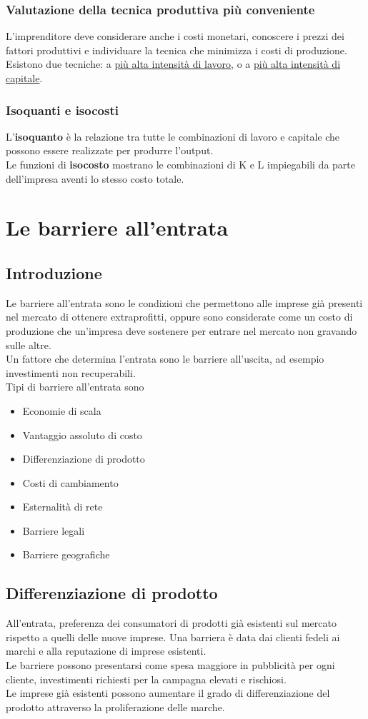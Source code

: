 \documentclass{report}
\begin{document}
	\subsection{Valutazione della tecnica produttiva più conveniente}
	L'imprenditore deve considerare anche i costi monetari, conoscere i prezzi dei fattori produttivi e individuare la tecnica che minimizza i costi di produzione.
	\medskip \\Esistono due tecniche: a \underline{più alta intensità di lavoro}, o a \underline{più alta intensità di capitale}.
	\subsection{Isoquanti e isocosti}
	L'\textbf{isoquanto} è la relazione tra tutte le combinazioni di lavoro e capitale che possono essere realizzate per produrre l'output.
	\medskip \\Le funzioni di \textbf{isocosto} mostrano le combinazioni di K e L impiegabili da parte dell'impresa aventi lo stesso costo totale.
	
	\chapter{Le barriere all'entrata}
	\section{Introduzione}
	Le barriere all'entrata sono le condizioni che permettono alle imprese già presenti nel mercato di ottenere extraprofitti, oppure sono considerate come un costo di produzione che un'impresa deve sostenere per entrare nel mercato non gravando sulle altre.
	\medskip \\Un fattore che determina l'entrata sono le barriere all'uscita, ad esempio investimenti non recuperabili.
	\medskip \\Tipi di barriere all'entrata sono
	\begin{itemize}
		\item Economie di scala
		\item Vantaggio assoluto di costo
		\item Differenziazione di prodotto
		\item Costi di cambiamento
		\item Esternalità di rete
		\item Barriere legali
		\item Barriere geografiche
	\end{itemize}
	\section{Differenziazione di prodotto}
	All'entrata, preferenza dei consumatori di prodotti già esistenti sul mercato rispetto a quelli delle nuove imprese. Una barriera è data dai clienti fedeli ai marchi e alla reputazione di imprese esistenti.
	\medskip \\
	Le barriere possono presentarsi come spesa maggiore in pubblicità per ogni cliente, investimenti richiesti per la campagna elevati e rischiosi.
	\medskip \\
	Le imprese già esistenti possono aumentare il grado di differenziazione del prodotto attraverso la proliferazione delle marche.
\end{document}
